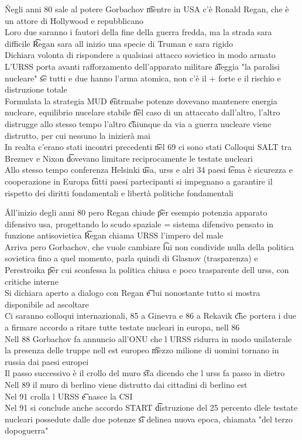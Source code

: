 \documentclass[12pt]{article}
\begin{document}
\v

Negli anni 80 sale al potere Gorbachov \t mentre in USA c'è Ronald Regan, che è un attore di Hollywood e repubblicano \\
Loro due saranno i fautori della fine della guerra fredda, ma la strada sara difficile \t Regan sara all inizio una specie di Truman e sara rigido \\
Dichiara volonta di rispondere a qualsiasi attacco sovietico in modo armato \\
L'URSS porta avanti rafforzamento dell'apparato militare \t aleggia "la paralisi nucleare" \t se tutti e due hanno l'arma atomica, non c'è il + forte e il rischio e distruzione totale \\
Formulata la strategia MUD \t entrmabe potenze dovevano mantenere energia nucleare, equilibrio nucelare stabile \t nel caso di un attaccato dall'altro, l'altro distrugge allo stesso tempo l'altro \t chiunque da via a guerra nucleare viene distrutto, per cui nessuno la inizierà mai \\
In realta c'erano stati incontri precedenti \t nel 69 ci sono stati Colloqui SALT tra Breznev e Nixon \t dovevano limitare reciprocamente le testate nucleari \\
Allo stesso tempo conferenza Helsinki \t usa, urss e alri 34 paesi \t tema è sicurezza e cooperazione in Europa \t tutti paesi partecipanti si impegnano a garantire il rispetto dei diritti fondamentali e libertà politiche fondamentali

\v

All'inizio degli anni 80 pero Regan chiude \t per esempio potenzia apparato difensivo usa, progettando lo scudo spaziale = sistema difensivo pensato in funzione antisovietica \t Regan chiama URSS l'impero del male \\
Arriva pero Gorbachov, che vuole cambiare \t lui non condivide nulla della politica sovietica fino a quel momento, parla quindi di Glasnov (trasparenza) e Perestroika \t per cui sconfessa la politica chiusa e poco trasparente dell urss, con critiche interne \\
Si dichiara aperto a dialogo con Regan \t e lui nonostante tutto si mostra disponibile ad ascoltare \\
Ci saranno colloqui internazionali, 85 a Ginevra e 86 a Rekavik \t che portera i due a firmare accordo a ritare tutte testate nucleari in europa, nell 86 \\
Nell 88 Gorbachov fa annuncio all'ONU che l URSS ridurra in modo unilaterale la presenza delle truppe nell est europeo \t mezzo milione di uomini tornano in russia dai paesi europei \\
Il passo successivo è il crollo del muro \t sta dicendo che l urss fa passo in dietro \\
Nell 89 il muro di berlino viene distrutto dai cittadini di berlino est \\
Nel 91 crolla l URSS \t e nasce la CSI \\
Nel 91 si conclude anche accordo START \t distruzione del 25 percento dlele testate nucleari possedute dalle due potenze \t si delinea nuova epoca, chiamata "del terzo dopoguerra"
\end{document}
